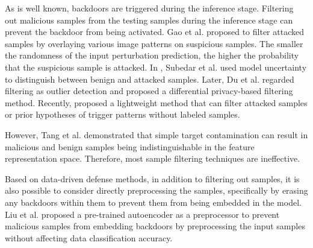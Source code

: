 \documentclass[conference]{IEEEtran}
\begin{document}
As is well known, backdoors are triggered during the inference stage.
Filtering out malicious samples from the testing samples during the inference stage can prevent the backdoor
from being activated. Gao et al. \cite{b71} proposed to filter attacked samples by overlaying various image patterns
on suspicious samples. The smaller the randomness of the input perturbation prediction, the higher the probability
that the suspicious sample is attacked. In \cite{b72}, Subedar et al. used model uncertainty to distinguish between
benign and attacked samples. Later, Du et al. \cite{b73} regarded filtering as outlier detection and proposed a
differential privacy-based filtering method. Recently, \cite{b74} proposed a lightweight method that can filter
attacked samples or prior hypotheses of trigger patterns without labeled samples.

However, Tang et al.\cite{b70} demonstrated that
simple target contamination can result in malicious and benign samples being
indistinguishable in the feature representation space. Therefore, most
sample filtering techniques are ineffective.

Based on data-driven defense methods, in addition to filtering out samples,
it is also possible to consider directly preprocessing the samples,
specifically by erasing any backdoors within them to prevent them from being embedded in the model.
Liu et al.\cite{b75} proposed a pre-trained autoencoder as a preprocessor to prevent malicious samples from embedding backdoors
by preprocessing the input samples without affecting data classification accuracy.
\end{document}

